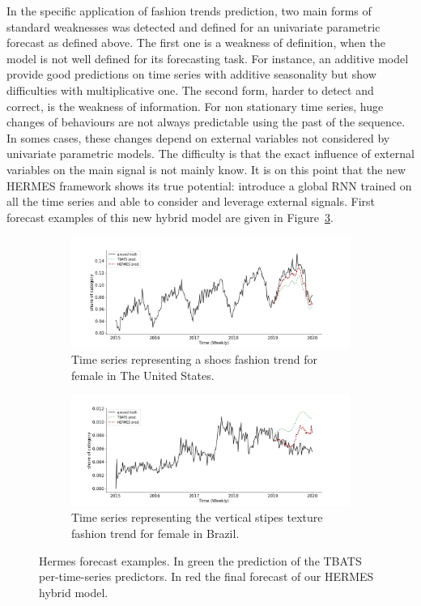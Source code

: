 \documentclass{article} %
\begin{document}
In the specific application of fashion trends prediction, two main forms of standard weaknesses was detected and defined for an univariate parametric forecast as defined above. The first one is a weakness of definition, when the model is not well defined for its forecasting task. For instance, an additive model provide good predictions on time series with additive seasonality but show difficulties with multiplicative one. The second form, harder to detect and correct, is the weakness of information. For non stationary time series, huge changes of behaviours are not always predictable using the past of the sequence. In somes cases, these changes depend on external variables not considered by univariate parametric models. The difficulty is that the exact influence of external variables on the main signal is not mainly know. It is on this point that  the new HERMES framework shows its true potential: introduce a global RNN trained on all the time series and able to consider and leverage external signals. First forecast examples of this new hybrid model are given in Figure~\ref{fig:introexamples}.


\begin{figure}
\centering
\begin{subfigure}{1.\textwidth}
  \centering
  \includegraphics[width=.9\linewidth]{figure/us_female_shoes}
  \caption{Time series representing a shoes fashion trend for female in The United States.}
  \label{fig:introexamples:sub1}
\end{subfigure}
\begin{subfigure}{1.\textwidth}
  \centering
  \includegraphics[width=.9\linewidth]{figure/br_female_texture_verticalstripe}
  \caption{Time series representing the vertical stipes texture fashion trend for female in Brazil.}
  \label{fig:introexamples:sub2}
\end{subfigure}
\caption{Hermes forecast examples. In green the prediction of the TBATS per-time-series predictors. In red the final forecast of our HERMES hybrid model.}
\label{fig:introexamples}
\end{figure}
\end{document}
